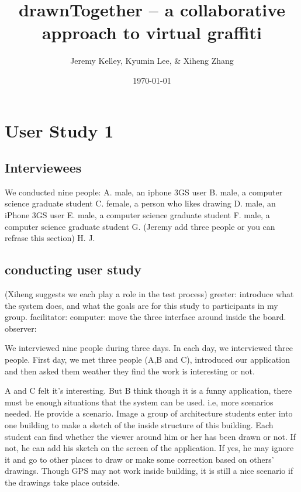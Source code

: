 \documentclass{www2010-submission}
\begin{document}
\setlength{\parindent}{0pt}
\setlength{\parskip}{.5ex plus 0.5ex minus 0.2ex}




\title{ drawnTogether -- a collaborative approach to virtual graffiti }

\author{ Jeremy Kelley, Kyumin Lee, \& Xiheng Zhang }

\date{\today}

\maketitle

\section{ User Study 1}
\subsection{Interviewees}
We conducted nine people:
A. male, an iphone 3GS user
B. male, a computer science graduate student
C. female, a person who likes drawing
D. male, an iPhone 3GS user
E. male, a computer science graduate student
F. male, a computer science graduate student
G. (Jeremy add three people or you can refrase this section)
H.
J.

\subsection{conducting user study}
(Xiheng suggests we each play a role in the test process)
greeter: introduce what the system does, and what the goals are for this study to participants in my group.
facilitator:
computer: move the three interface around inside the board.
observer:
 
We interviewed nine people during three days. In each day, we interviewed three people. 
First day, we met three people (A,B and C), introduced our application and then asked them weather they find the work is interesting or not.

A and C felt it's interesting. But B think though it is a funny application, there must be enough situations that the system can be used. i.e, more scenarios needed. He provide a scenario. Image a group of architecture students enter into one building to make a sketch of the inside structure of this building. Each student can find whether the viewer around him or her has been drawn or not. If not, he can add his sketch on the screen of the application. If yes, he may ignore it and go to other places to draw or make some correction based on others' drawings. Though GPS may not work inside building, it is still a nice scenario if the drawings take place outside.
\end{document}
